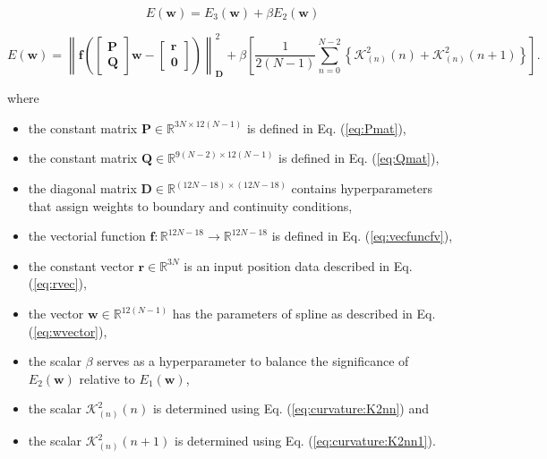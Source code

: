 \begin{equation}\label{eq:BasicCostCube}
E(\mathbf{w})=E_{3}(\mathbf{w})+\beta E_{2}(\mathbf{w})
\end{equation}

\begin{equation}
E(\mathbf{w})
=
\left\|
\mathbf{f}
\left(
\begin{bmatrix}
\mathbf{P}\\
\mathbf{Q}
\end{bmatrix}
\mathbf{w}
-
\begin{bmatrix}
\mathbf{r}\\
\mathbf{0}
\end{bmatrix}
\right)
\right\|_{\mathbf{D}}^{2}
+\beta 
\left[
\frac{1}{2(N-1)}
\sum\limits_{n=0}^{N-2}
\left\{
\mathcal{K}_{(n)}^{2}(n)
+
\mathcal{K}_{(n)}^{2}(n+1)
\right\}
\right].
\end{equation}

where 
\begin{itemize}
\item the constant matrix $\mathbf{P} \in \mathbb{R}^{3N\times 12(N-1)}$ is defined in Eq. (\ref{eq:Pmat}),
\item the constant matrix $\mathbf{Q} \in \mathbb{R}^{9(N-2)\times 12(N-1)}$ is defined in Eq. (\ref{eq:Qmat}),
\item the diagonal matrix $\mathbf{D} \in \mathbb{R}^{(12N-18)\times (12N-18)}$ contains hyperparameters that assign weights to boundary and continuity conditions,
\item the vectorial function $\mathbf{f}: \mathbb{R}^{12N-18} \to \mathbb{R}^{12N-18}$  is defined in Eq. (\ref{eq:vecfuncfv}),
\item the constant vector $\mathbf{r} \in \mathbb{R}^{3N}$ is an input position data described in Eq. (\ref{eq:rvec}),
\item the vector $\mathbf{w} \in \mathbb{R}^{12(N-1)}$ has the parameters of spline as described in Eq. (\ref{eq:wvector}),
\item the scalar $\beta$ serves as a hyperparameter to balance the significance of $E_{2}(\mathbf{w})$ relative to $E_{1}(\mathbf{w})$,
\item the scalar $\mathcal{K}_{(n)}^{2}(n)$ is determined using Eq. (\ref{eq:curvature:K2nn}) and 
\item the scalar $\mathcal{K}_{(n)}^{2}(n+1)$ is determined using Eq. (\ref{eq:curvature:K2nn1}).
\end{itemize}

